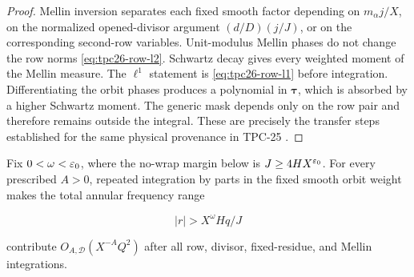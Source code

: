 \begin{proof}
Mellin inversion separates each fixed smooth factor depending on
\(m_\alpha j/X\), on the normalized opened-divisor argument
\((d/D)(j/J)\), or on the corresponding second-row variables.
Unit-modulus Mellin phases do not change the row norms
\eqref{eq:tpc26-row-l2}.  Schwartz decay gives every weighted moment of
the Mellin measure.  The \(\ell^1\) statement is
\eqref{eq:tpc26-row-l1} before integration.  Differentiating the orbit
phases produces a polynomial in \(\boldsymbol\tau\), which is absorbed
by a higher Schwartz moment.  The generic mask depends only on the row
pair and therefore remains outside the integral.  These are precisely
the transfer steps established for the same physical provenance in
TPC-25 \citep{WangTPC25}.
\end{proof}

\begin{lemma}
\label{lem:tpc26-automatic-tail}
Fix \(0<\omega<\varepsilon_0\), where the no-wrap margin below is
\(J\ge4HX^{\varepsilon_0}\).  For every prescribed \(A>0\), repeated
integration by parts in the fixed smooth orbit weight makes the total
annular frequency range

\begin{equation}
 |r|>X^\omega Hq/J
 \label{eq:tpc26-tail-range}
\end{equation}

contribute \(O_{A,\mathscr D}(X^{-A}Q^2)\) after all row, divisor,
fixed-residue, and Mellin integrations.
\end{lemma}

